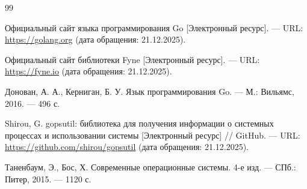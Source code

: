 \begin{thebibliography}{99}

Официальный сайт языка программирования Go [Электронный ресурс]. — URL: \url{https://golang.org} (дата обращения: 21.12.2025).

Официальный сайт библиотеки Fyne [Электронный ресурс]. — URL: \url{https://fyne.io} (дата обращения: 21.12.2025).

Донован, А. А., Керниган, Б. У. Язык программирования Go. — М.: Вильямс, 2016. — 496 с.

Shirou, G. gopsutil: библиотека для получения информации о системных процессах и использовании системы [Электронный ресурс] // GitHub. — URL: \url{https://github.com/shirou/gopsutil} (дата обращения: 21.12.2025).

Таненбаум, Э., Бос, Х. Современные операционные системы. 4-е изд. — СПб.: Питер, 2015. — 1120 с.

\end{thebibliography}
